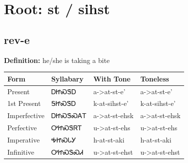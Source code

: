 \documentclass{article}%
\begin{document}
%
\normalsize%
\section*{Root: st / sihst}%
\subsection*{rev-e}%
\textbf{Definition: }%
he/she is taking a bite%
\\[0.5em]%
\begin{tabular}{|l|l|l|l|}%
\hline%
\textbf{Form}&\textbf{Syllabary}&\textbf{With Tone}&\textbf{Toneless}\\%
\hline%
Present&ᎠᏥᏍᏕᎠ&a{-}>at{-}st{-}e'&a{-}>at{-}st{-}e'\\%
1st Present&ᎦᏥᏍᏕᎠ&k{-}at{-}sihst{-}e'&k{-}at{-}sihst{-}e'\\%
Imperfective&ᎠᏥᏍᏕᏍᎪᎢ&a{-}>at{-}st{-}ehsk&a{-}>at{-}st{-}ehsk\\%
Perfective&ᎤᏥᏍᏕᏒᎢ&u{-}>at{-}st{-}ehs&u{-}>at{-}st{-}ehs\\%
Imperative&ᎭᏥᏍᏓᎩ&h{-}at{-}st{-}aki&h{-}at{-}st{-}aki\\%
Infinitive&ᎤᏥᏍᏕᏍᏗ&u{-}>at{-}st{-}ehst&u{-}>at{-}st{-}ehst\\%
\hline%
\end{tabular}%
\\[1em]%
\end{document}

